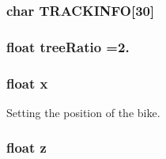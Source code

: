 \subsubsection[{T\-R\-A\-C\-K\-I\-N\-F\-O}]{\setlength{\rightskip}{0pt plus 5cm}char T\-R\-A\-C\-K\-I\-N\-F\-O[30]}\label{_game_8cpp_ad47c95dccf396f33386da3d92e3d04e1}
\subsubsection[{tree\-Ratio}]{\setlength{\rightskip}{0pt plus 5cm}float tree\-Ratio =2.}\label{_game_8cpp_adcabdfd942582d19db29a412054e806a}
\subsubsection[{x}]{\setlength{\rightskip}{0pt plus 5cm}float x}\label{_game_8cpp_ad0da36b2558901e21e7a30f6c227a45e}


Setting the position of the bike. 

\subsubsection[{z}]{\setlength{\rightskip}{0pt plus 5cm}float z}\label{_game_8cpp_af73583b1e980b0aa03f9884812e9fd4d}
